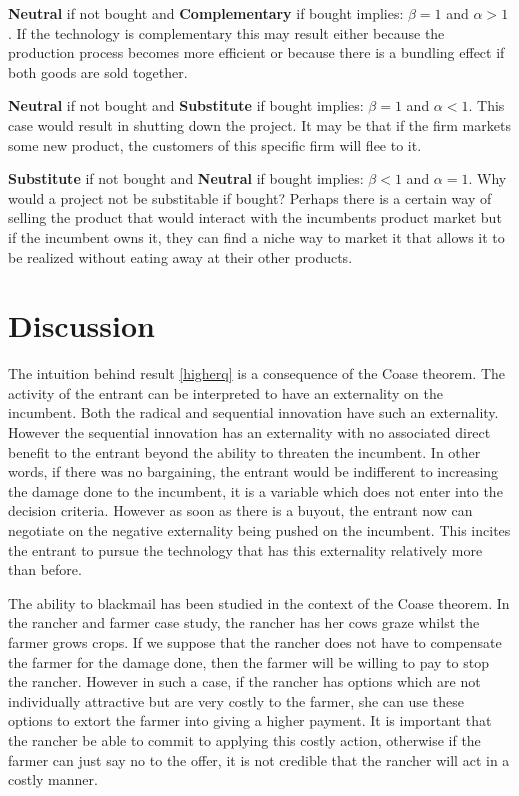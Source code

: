 \textbf{Neutral} if not bought and \textbf{Complementary} if bought implies: $\beta=1$ and $\alpha>1$. If the technology is complementary this may result either because the production process becomes more efficient or because there is a bundling effect if both goods are sold together. 

\textbf{Neutral} if not bought and \textbf{Substitute} if bought implies: $\beta=1$ and $\alpha<1$. This case would result in shutting down the project. It may be that if the firm markets some new product, the customers of this specific firm will flee to it. 

\textbf{Substitute} if not bought and \textbf{Neutral} if bought implies: $\beta<1$ and $\alpha=1$. Why would a project not be substitable if bought? Perhaps there is a certain way of selling the product that would interact with the incumbents product market but if the incumbent owns it, they can find a niche way to market it that allows it to be realized without eating away at their other products.
\section{Discussion}\label{discussion}

The intuition behind result \ref{higherq} is a consequence of the Coase theorem. The activity of the entrant can be interpreted to have an externality on the incumbent. Both the radical and sequential innovation have such an externality. However the sequential innovation has an externality with no associated direct benefit to the entrant beyond the ability to threaten the incumbent. In other words, if there was no bargaining, the entrant would be indifferent to increasing the damage done to the incumbent, it is a variable which does not enter into the decision criteria. However as soon as there is a buyout, the entrant now can negotiate on the negative externality being pushed on the incumbent. This incites the entrant to pursue the technology that has this externality relatively more than before. 

The ability to blackmail has been studied in the context of the Coase theorem\citep{Dem}. In the rancher and farmer case study, the rancher has her cows graze whilst the farmer grows crops. If we suppose that the rancher does not have to compensate the farmer for the damage done, then the farmer will be willing to pay to stop the rancher. However in such a case, if the rancher has options which are not individually attractive but are very costly to the farmer, she can use these options to extort the farmer into giving a higher payment. It is important that the rancher be able to commit to applying this costly action, otherwise if the farmer can just say no to the offer, it is not credible that the rancher will act in a costly manner. 

